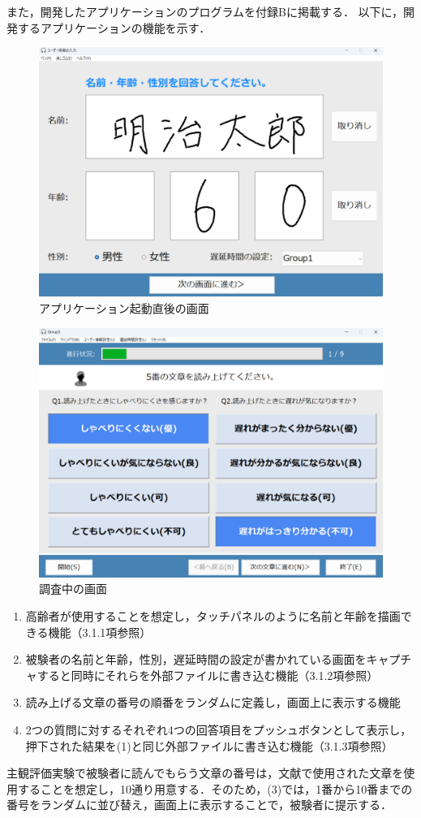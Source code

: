 また，開発したアプリケーションのプログラムを付録Bに掲載する．
以下に，開発するアプリケーションの機能を示す．
\begin{figure}[tbp]
  \centering
  \includegraphics[scale=0.4]{figures/Syukann/gamen_1.pdf}
  \caption{アプリケーション起動直後の画面}
  \label{fig:1_userInterface}
\end{figure}
\begin{figure}[tbp]
  \centering
  \includegraphics[scale=0.4]{figures/Syukann/app_2.pdf}
  \caption{調査中の画面}
  \label{fig:2_userInterface}
\end{figure}
\begin{enumerate}[leftmargin=*]
  \item 高齢者が使用することを想定し，タッチパネルのように名前と年齢を描画できる機能（3.1.1項参照）
  \item 被験者の名前と年齢，性別，遅延時間の設定が書かれている画面をキャプチャすると同時にそれらを外部ファイルに書き込む機能（3.1.2項参照）
  \item 読み上げる文章の番号の順番をランダムに定義し，画面上に表示する機能
  \item 2つの質問に対するそれぞれ4つの回答項目をプッシュボタンとして表示し，押下された結果を(1)と同じ外部ファイルに書き込む機能（3.1.3項参照）
\end{enumerate}
主観評価実験で被験者に読んでもらう文章の番号は，文献\cite{kayama}で使用された文章を使用することを想定し，10通り用意する．そのため，(3)では，1番から10番までの番号をランダムに並び替え，画面上に表示することで，被験者に提示する．
